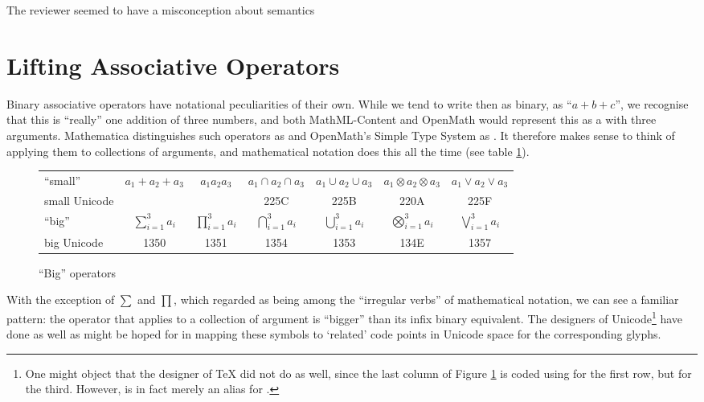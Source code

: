 \documentclass{llncs}
\begin{document}
\begin{newpart}{The reviewer seemed to have a misconception about semantics}
\section{Lifting Associative Operators}
Binary associative operators have notational peculiarities of their own. While we tend to
write then as binary, as ``$a+b+c$'', we recognise that this is ``really'' one addition of
three numbers, and both MathML-Content and OpenMath would represent this as a
{} with three arguments. Mathematica distinguishes such operators as
{} and OpenMath's Simple Type System \cite{Davenport2000c} as
{}. It therefore makes sense to think of applying them to collections of
arguments, and mathematical notation does this all the time (see table \ref{Tab:big}).

\begin{figure}[h]\vspace*{-1.5em}
\begin{tabular}{lcccccc}\hline
``small''&$a_1+a_2+a_3$&$a_1a_2a_3$&$a_1\cap a_2\cap a_3$
&$a_1\cup a_2\cup a_3$
&$a_1\otimes a_2\otimes a_3$
&$a_1\lor a_2\lor a_3$
\\
small Unicode&&&225C&225B&220A&225F\\
``big''&$\sum_{i=1}^3 a_i$&$\prod_{i=1}^3 a_i$&$\bigcap_{i=1}^3 a_i$
&$\bigcup_{i=1}^3 a_i$
&$\bigotimes_{i=1}^3 a_i$
&$\bigvee_{i=1}^3 a_i$
\\
big Unicode&1350&1351&1354&1353&134E&1357\\\hline
\end{tabular}\vspace*{-.5em}
\caption{``Big'' operators}\label{Tab:big}\vspace*{-2em}
\end{figure}

With the exception of $\sum$ and $\prod$, which \cite{Davenportminor2008}
regarded as being among the ``irregular verbs'' of mathematical notation, we can see a
familiar pattern: the operator that applies to a collection of argument is
``bigger'' than its infix binary equivalent. The designers of
Unicode\footnote{One might object that the designer of \TeX{} did not do as
well, since the last column of Figure \ref{Tab:big} is coded using
{} for the first row, but {} for the third.
However,  {} is in fact merely an alias for {}.}
have done as well as might be hoped for in mapping these symbols to `related'
code points in Unicode space for the corresponding glyphs.


\end{newpart}
\end{document}
